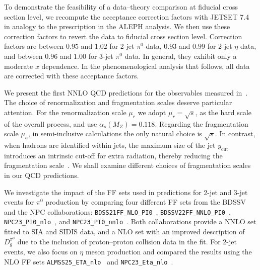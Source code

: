 \documentclass[10pt,aps,prl,twocolumn,preprintnumbers,nofootinbib]{revtex4-2}
\newcommand{\code}[1]{\texttt{#1}}
\newcommand{\JETSET}{\textsc{JETSET 7.4}\xspace}
\newcommand{\ycut}{y_\mathrm{cut}}
\newcommand{\NPCnlo}{\code{NPC23\_PI0\_nlo}\xspace}
\newcommand{\NPCnnlo}{\code{NPC23\_PI0\_nnlo}\xspace}
\newcommand{\BDSS}{\code{BDSS21FF\_NLO\_PI0}\xspace}
\newcommand{\BDSSV}{\code{BDSSV22FF\_NNLO\_PI0}\xspace}
\newcommand{\NPCeta}{\code{NPC23\_Eta\_nlo}\xspace}
\newcommand{\ALMSS}{\code{ALMSS25\_ETA\_nlo}\xspace}
\begin{document}
To demonstrate the feasibility of a data--theory comparison at fiducial cross section level, we recompute the
acceptance correction factors with \JETSET~\cite{Sjostrand:1994kzr} in analogy to the prescription in the ALEPH analysis.
We then use these correction factors to revert the data to fiducial cross section level.
Correction factors are between $0.95$ and $1.02$ for 2-jet $\pi^0$ data, $0.93$ and $0.99$ for 2-jet $\eta$ data, and between $0.96$ and $1.00$ for 3-jet $\pi^0$ data. In general, they exhibit only a moderate $x$ dependence.
In the phenomenological analysis that follows, all data are corrected with these acceptance factors.

We present the first NNLO QCD predictions for the observables measured in~\cite{ALEPH:1999udi}.
The choice of renormalization and fragmentation scales deserve particular attention.
For the renormalization scale $\mu_r$ we adopt $\mu_r = \sqrt{s}$, as the hard scale of the overall process, and use $\alpha_s(M_Z)=0.118$.
Regarding the fragmentation scale $\mu_a$, in semi-inclusive calculations the only natural choice is $\sqrt{s}$.
In contrast, when hadrons are identified within jets, the maximum size of the jet $\ycut$ introduces an intrinsic cut-off for extra radiation, thereby reducing the fragmentation scale~\cite{Dokshitzer:1987nm,Dokshitzer:1991wu,Procura:2009vm,Jain:2011xz,Kaufmann:2015hma}.
We shall examine different choices of fragmentation scales in our QCD predictions.

We investigate the impact of the FF sets used in predictions for 2-jet and 3-jet events for $\pi^0$ production by comparing four different FF sets from the BDSSV and the NPC collaborations: \BDSS~\cite{Borsa:2021ran}, \BDSSV~\cite{Borsa:2022vvp}, \NPCnlo~\cite{Gao:2025bko}, and \NPCnnlo~\cite{Gao:2025hlm}.
Both collaborations provide a NNLO set fitted to SIA and SIDIS data, and a NLO set with an improved description of $D_g^{\pi^0}$ due to the inclusion of proton--proton collision data in the fit.
For 2-jet events, we also focus on $\eta$ meson production and compared the results using the NLO FF sets \ALMSS~\cite{Aidala:2025kep} and \NPCeta~\cite{Gao:2025bko}.
\newline
\end{document}
